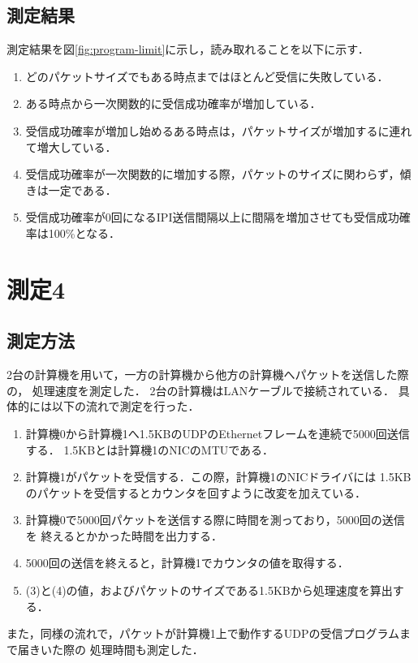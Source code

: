 \documentclass[12pt]{jsarticle}
\begin{document}
\subsection{測定結果}\label{result-program-limit}


測定結果を図\ref{fig:program-limit}に示し，読み取れることを以下に示す．
\begin{enumerate}
    \item どのパケットサイズでもある時点まではほとんど受信に失敗している．
    \item ある時点から一次関数的に受信成功確率が増加している．
    \item 受信成功確率が増加し始めるある時点は，パケットサイズが増加するに連れて増大している．
    \item 受信成功確率が一次関数的に増加する際，パケットのサイズに関わらず，傾きは一定である．
    \item 受信成功確率が0回になるIPI送信間隔以上に間隔を増加させても受信成功確率は100\%となる．
\end{enumerate}

\section{測定4}

\subsection{測定方法}

2台の計算機を用いて，一方の計算機から他方の計算機へパケットを送信した際の，
処理速度を測定した．
2台の計算機はLANケーブルで接続されている．
具体的には以下の流れで測定を行った．
\begin{enumerate}
    \item 計算機0から計算機1へ1.5KBのUDPのEthernetフレームを連続で5000回送信する．
        1.5KBとは計算機1のNICのMTUである．
    \item 計算機1がパケットを受信する．この際，計算機1のNICドライバには
        1.5KBのパケットを受信するとカウンタを回すように改変を加えている．
    \item 計算機0で5000回パケットを送信する際に時間を測っており，5000回の送信を
        終えるとかかった時間を出力する．
    \item 5000回の送信を終えると，計算機1でカウンタの値を取得する．
    \item (3)と(4)の値，およびパケットのサイズである1.5KBから処理速度を算出する．
\end{enumerate}
また，同様の流れで，パケットが計算機1上で動作するUDPの受信プログラムまで届きいた際の
処理時間も測定した．
\end{document}
